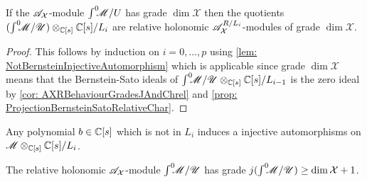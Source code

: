 \begin{lemma}\label{lem: QuotientsRelativeHolonomic}
  If the $\mathscr{A}_\mathcal{X}$-module $\int^0 \mkern -8mu\mathscr{M}/U$ has grade $\dim \mathcal{X}$ then the quotients $(\int^0 \mkern -8mu\mathscr{M}/\mathscr{U})\otimes_{\mathbb{C}[s]} \mathbb{C}[s]/L_{i}$ are relative holonomic $\mathscr{A}_\mathcal{X}^{R/L_i}$-modules of grade $\dim\mathcal{X}$.
\end{lemma}
\begin{proof}
  This follows by induction on $i=0,\ldots,p$ using \cref{lem: NotBernsteinInjectiveAutomorphism} which is applicable since grade $\dim \mathcal{X}$ means that the Bernstein-Sato ideals of $\int^0 \mkern -8mu\mathscr{M}/\mathscr{U} \otimes_{\mathbb{C}[s]} \mathbb{C}[s]/L_{i-1}$ is the zero ideal by \cref{cor: AXRBehaviourGradesJAndChrel} and \cref{prop: ProjectionBernsteinSatoRelativeChar}.
\end{proof}
\begin{lemma}\label{lem: InjectiveEll}
  Any polynomial $b\in \mathbb{C}[s]$ which is not in $L_i$ induces a injective automorphisms on $\mathscr{M} \otimes_{\mathbb{C}[s]}\mathbb{C}[s]/L_i$.
\end{lemma}
\begin{lemma}\label{lem: GradeNPlusOne}
  The relative holonomic $\mathscr{A}_\mathcal{X}$-module $\int^0 \mkern -8mu\mathscr{M}/\mathscr{U}$ has grade $j(\int^0 \mkern -8mu\mathscr{M}/\mathscr{U})\geq \dim \mathcal{X}+1$.
\end{lemma}
